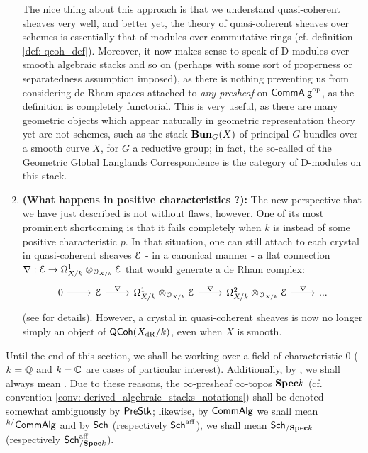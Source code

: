 \begin{enumerate}
                The nice thing about this approach is that we understand quasi-coherent sheaves very well, and better yet, the theory of quasi-coherent sheaves over schemes is essentially that of modules over commutative rings (cf. definition \ref{def: qcoh_def}). Moreover, it now makes sense to speak of D-modules over smooth algebraic stacks and so on (perhaps with some sort of properness or separatedness assumption imposed), as there is nothing preventing us from considering de Rham spaces attached to \textit{any presheaf} on $\mathsf{Comm}\mathsf{Alg}^{\mathrm{op}}$, as the definition is completely functorial. This is very useful, as there are many geometric objects which appear naturally in geometric representation theory yet are not schemes, such as the stack $\mathbf{Bun}_G(X)$ of principal $G$-bundles over a smooth curve $X$, for $G$ a reductive group; in fact, the so-called  of the Geometric Global Langlands Correspondence is the category of D-modules on this stack.
                \item \textbf{(What happens in positive characteristics ?):} The new perspective that we have just described is not without flaws, however. One of its most prominent shortcoming is that it fails completely when $k$ is instead of some positive characteristic $p$. In that situation, one can still attach to each crystal in quasi-coherent sheaves $\mathcal{E}$ - in a canonical manner - a flat connection $\nabla: \E \to \Omega^1_{X/k} \tensor_{\calO_{X/k}} \E$ that would generate a de Rham complex:
                    $$
                        \begin{tikzcd}
                        	0 & \E & {\Omega^1_{X/k} \tensor_{\calO_{X/k}} \E} & {\Omega^2_{X/k} \tensor_{\calO_{X/k}} \E} & {...}
                        	\arrow["\nabla", from=1-4, to=1-5]
                        	\arrow["\nabla", from=1-3, to=1-4]
                        	\arrow["\nabla", from=1-2, to=1-3]
                        	\arrow[from=1-1, to=1-2]
                        \end{tikzcd}
                    $$
                (see \cite[\href{https://stacks.math.columbia.edu/tag/07J5}{Tag 07J5}]{stacks} for details). However, a crystal in quasi-coherent sheaves is now no longer simply an object of $\mathsf{QCoh}(X_{\mathrm{dR}}/k)$, even when $X$ is smooth. 
            \end{enumerate}
                    
            \begin{convention}
                Until the end of this section, we shall be working over a field of characteristic $0$ ($k = \mathbb{Q}$ and $k = \mathbb{C}$ are cases of particular interest). Additionally, by , we shall always mean . Due to these reasons, the $\infty$-presheaf $\infty$-topos $\mathbf{Spec} k$ (cf. convention \ref{conv: derived_algebraic_stacks_notations}) shall be denoted somewhat ambiguously by $\mathsf{Pre}\mathsf{Stk}$; likewise, by $\mathsf{Comm}\mathsf{Alg}$ we shall mean ${}^{k/}\mathsf{Comm}\mathsf{Alg}$ and by $\mathsf{Sch}$ (respectively $\mathsf{Sch}^{\mathrm{aff}}$), we shall mean $\mathsf{Sch}_{/\mathbf{Spec} k}$ (respectively $\mathsf{Sch}^{\mathrm{aff}}_{/\mathbf{Spec} k}$).
            \end{convention}
    
